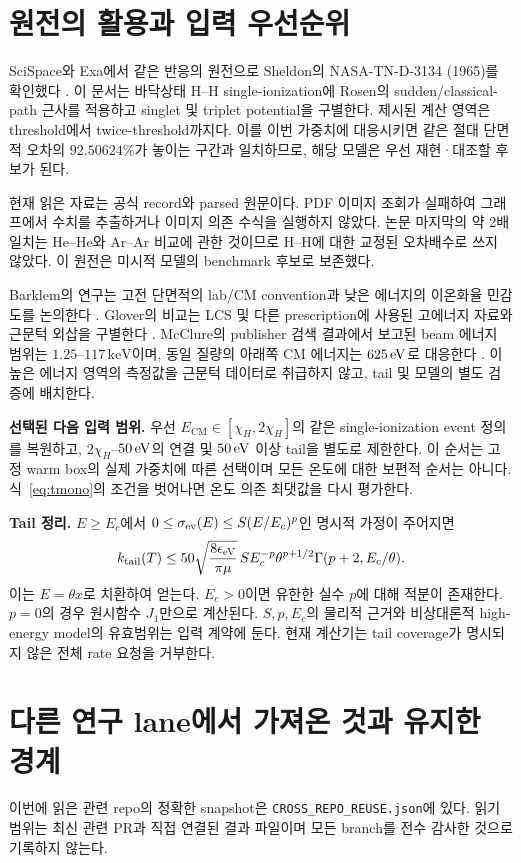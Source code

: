 \documentclass[11pt,a4paper]{article}
\newcommand{\sig}{\sigma_{\rm ev}}\newcommand{\cm}{\mathrm{CM}}\newcommand{\lab}{\mathrm{lab}}\newcommand{\hh}{\mathrm{HH}}
\begin{document}
\newpage
\section{원전의 활용과 입력 우선순위}
SciSpace와 Exa에서 같은 반응의 원전으로 Sheldon의 NASA-TN-D-3134 (1965)를 확인했다 \cite{sheldon}. 이 문서는 바닥상태 H--H single-ionization에 Rosen의 sudden/classical-path 근사를 적용하고 singlet 및 triplet potential을 구별한다. 제시된 계산 영역은 threshold에서 twice-threshold까지다. 이를 이번 가중치에 대응시키면 같은 절대 단면적 오차의 $92.50624\%$가 놓이는 구간과 일치하므로, 해당 모델은 우선 재현·대조할 후보가 된다.

현재 읽은 자료는 공식 record와 parsed 원문이다. PDF 이미지 조회가 실패하여 그래프에서 수치를 추출하거나 이미지 의존 수식을 실행하지 않았다. 논문 마지막의 약 2배 일치는 He--He와 Ar--Ar 비교에 관한 것이므로 H--H에 대한 교정된 오차배수로 쓰지 않았다. 이 원전은 미시적 모델의 benchmark 후보로 보존했다.

Barklem의 연구는 고전 단면적의 lab/CM convention과 낮은 에너지의 이온화율 민감도를 논의한다 \cite{barklem}. Glover의 비교는 LCS 및 다른 prescription에 사용된 고에너지 자료와 근문턱 외삽을 구별한다 \cite{glover}. McClure의 publisher 검색 결과에서 보고된 beam 에너지 범위는 $1.25$--$117\,\mathrm{keV}$이며, 동일 질량의 아래쪽 CM 에너지는 $625\,\mathrm{eV}$로 대응한다 \cite{mcclure}. 이 높은 에너지 영역의 측정값을 근문턱 데이터로 취급하지 않고, tail 및 모델의 별도 검증에 배치한다.

\textbf{선택된 다음 입력 범위.} 우선 $E_{\cm}\in[\chi_H,2\chi_H]$의 같은 single-ionization event 정의를 복원하고, $2\chi_H$--$50\,\mathrm{eV}$의 연결 및 $50\,\mathrm{eV}$ 이상 tail을 별도로 제한한다. 이 순서는 고정 warm box의 실제 가중치에 따른 선택이며 모든 온도에 대한 보편적 순서는 아니다. 식~\eqref{eq:tmono}의 조건을 벗어나면 온도 의존 최댓값을 다시 평가한다.

\textbf{Tail 정리.} $E\ge E_c$에서 $0\le\sig(E)\le S(E/E_c)^p$인 명시적 가정이 주어지면
\begin{equation}
k_{\rm tail}(T)\le
50\sqrt{\frac{8\epsilon_{\mathrm{eV}}}{\pi\mu}}\,
S E_c^{-p}\theta^{p+1/2}\Gamma(p+2,E_c/\theta).
\end{equation}
이는 $E=\theta x$로 치환하여 얻는다. $E_c>0$이면 유한한 실수 $p$에 대해 적분이 존재한다. $p=0$의 경우 원시함수 $J_1$만으로 계산된다. $S,p,E_c$의 물리적 근거와 비상대론적 high-energy model의 유효범위는 입력 계약에 둔다. 현재 계산기는 tail coverage가 명시되지 않은 전체 rate 요청을 거부한다.

\newpage
\section{다른 연구 lane에서 가져온 것과 유지한 경계}
이번에 읽은 관련 repo의 정확한 snapshot은 \texttt{CROSS\_REPO\_REUSE.json}에 있다. 읽기 범위는 최신 관련 PR과 직접 연결된 결과 파일이며 모든 branch를 전수 감사한 것으로 기록하지 않는다.
\end{document}
